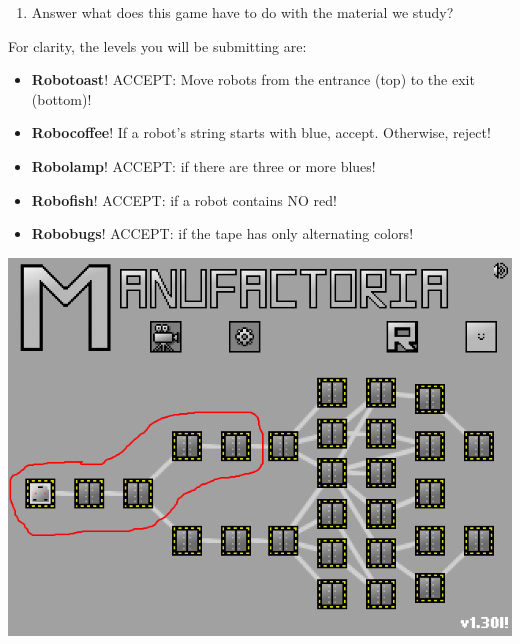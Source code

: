 \documentclass[10pt, legalpaper]{exam}
\begin{document}
\begin{questions}
\begin{enumerate}
\item Answer what does this game have to do with the material we study?\end{enumerate}
For clarity, the levels you will be submitting are:
\begin{itemize}
\item \textbf{Robotoast}! ACCEPT: Move robots from the entrance (top) to the exit (bottom)!
\item \textbf{Robocoffee}! If a robot's string starts with blue, accept. Otherwise, reject!
\item \textbf{Robolamp}! ACCEPT: if there are three or more blues!
\item \textbf{Robofish}! ACCEPT: if a robot contains NO red!
\item \textbf{Robobugs}! ACCEPT: if the tape has only alternating colors!
\end{itemize}
\includegraphics[scale=0.7]{manufactoria.png}


\end{questions}
\end{document}
